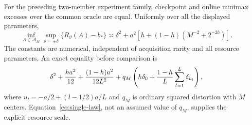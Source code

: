 \begin{theorem}\label{thm:single-probe}
For the preceding two-member experiment family, checkpoint and online minimax excesses over the common oracle are equal. Uniformly over all the displayed parameters,
\begin{equation}\label{eq:single-law}
 \inf_{A\in\mathcal A_M}\sup_{\vartheta=\pm\delta}
       \{R_\vartheta(A)-b_*\}
 \asymp \delta^2+a^2\left[h+(1-h)(M^{-2}+2^{-2b})\right].
\end{equation}
The constants are numerical, independent of acquisition rarity and all resource parameters. An exact equality before comparison is
\begin{equation}\label{eq:single-exact}
 \delta^2+{ha^2\over12}+{(1-h)a^2\over12L^2}
       +q_M\left(h\delta_0+\frac{1-h}{L}\sum_{l=1}^L\delta_{u_l}\right),
\end{equation}
where $u_l=-a/2+(l-1/2)a/L$ and $q_M$ is ordinary squared distortion with $M$ centers. Equation~\eqref{eq:single-law}, not an assumed value of $q_M$, supplies the explicit resource scale.
\end{theorem}
